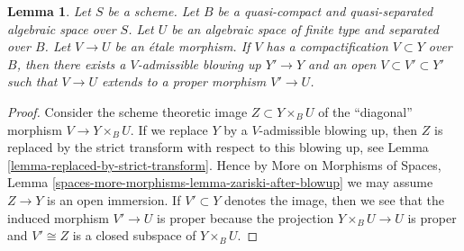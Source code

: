 \documentclass[10pt,a4paper]{amsart}
\theoremstyle{plain}
\newtheorem{lemma}[subsection]{Lemma}
\theoremstyle{definition}
\theoremstyle{remark}
\numberwithin{equation}{subsection}
\begin{document}
\begin{lemma}
\label{lemma-compactification-dominates}
Let $S$ be a scheme. Let $B$ be a quasi-compact and quasi-separated
algebraic space over $S$. Let $U$ be an algebraic space
of finite type and separated over $B$. Let $V \to U$ be an \'etale morphism.
If $V$ has a compactification $V \subset Y$ over $B$, then there
exists a $V$-admissible blowing up $Y' \to Y$ and an
open $V \subset V' \subset Y'$ such that $V \to U$
extends to a proper morphism $V' \to U$.
\end{lemma}

\begin{proof}
Consider the scheme theoretic image $Z \subset Y \times_B U$
of the ``diagonal'' morphism $V \to Y \times_B U$. If we replace
$Y$ by a $V$-admissible blowing up, then $Z$ is replaced by
the strict transform with respect to this blowing up, see
Lemma \ref{lemma-replaced-by-strict-transform}. Hence by
More on Morphisms of Spaces, Lemma
\ref{spaces-more-morphisms-lemma-zariski-after-blowup}
we may assume $Z \to Y$
is an open immersion. If $V' \subset Y$ denotes the image, then we
see that the induced morphism $V' \to U$ is proper because the
projection $Y \times_B U \to U$ is proper and $V' \cong Z$
is a closed subspace of $Y \times_B U$.
\end{proof}
\end{document}
